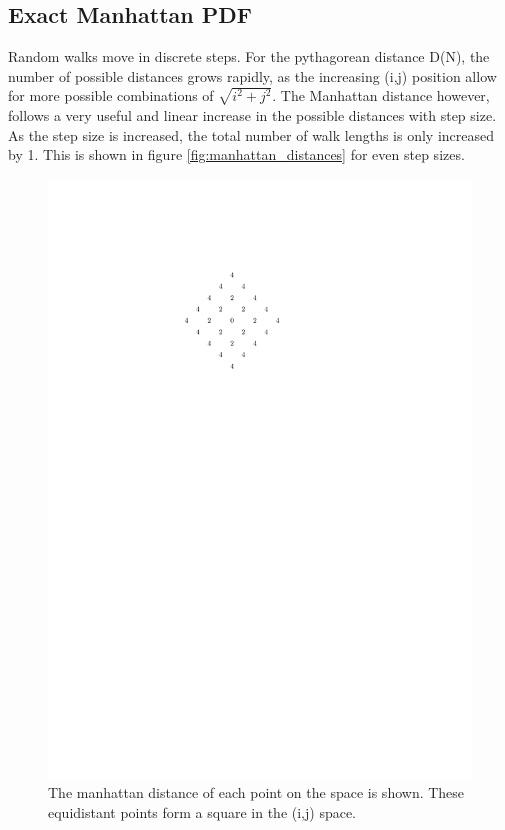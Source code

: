  	\subsection{Exact Manhattan PDF}
	Random walks move in discrete steps. For the pythagorean distance D(N), the number of possible distances grows rapidly, as the increasing (i,j) position allow for more possible combinations of $\sqrt{i^2+j^2}$. The Manhattan distance however, follows a very useful and linear increase in the possible distances with step size. As the step size is increased, the total number of walk lengths is only increased by 1. This is shown in figure \ref{fig:manhattan_distances} for even step sizes. 
	\begin{figure}
	\centering
	\includegraphics{figs/rings.pdf}
	\caption{The manhattan distance of each point on the space is shown. These equidistant points form a square in the (i,j) space.}
	\label{fig:manhattan_distance}
	\end{figure}
	
